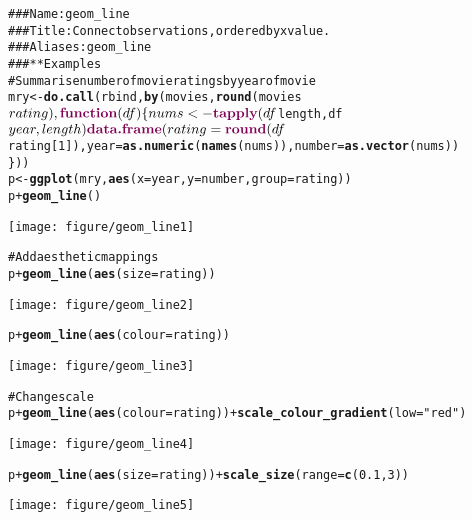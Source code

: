 \documentclass[a4paper,titlepage]{tufte-handout}\usepackage{graphicx, color}
\makeatletter
\def\maxwidth{ %
  \ifdim\Gin@nat@width>\linewidth
    \linewidth
  \else
    \Gin@nat@width
  \fi
}
\newcommand{\hlfunctioncall}[1]{\textcolor[rgb]{0.501960784313725,0,0.329411764705882}{\textbf{#1}}}%
\newcommand{\hlstring}[1]{\textcolor[rgb]{0.6,0.6,1}{#1}}%
\newcommand{\hlcomment}[1]{\textcolor[rgb]{0.180392156862745,0.6,0.341176470588235}{#1}}%
\newenvironment{kframe}{%
 \def\at@end@of@kframe{}%
 \ifinner\ifhmode%
  \def\at@end@of@kframe{\end{minipage}}%
  \begin{minipage}{\columnwidth}%
 \fi\fi%
 \def\FrameCommand##1{\hskip\@totalleftmargin \hskip-\fboxsep
 \colorbox{shadecolor}{##1}\hskip-\fboxsep
     \hskip-\linewidth \hskip-\@totalleftmargin \hskip\columnwidth}%
 \MakeFramed {\advance\hsize-\width
   \@totalleftmargin\z@ \linewidth\hsize
   \@setminipage}}%
 {\par\unskip\endMakeFramed%
 \at@end@of@kframe}
\newenvironment{knitrout}{}{} %
\makeatother
\begin{document}
\begin{knitrout}
\color{fgcolor}\begin{kframe}
\begin{alltt}
\hlcomment{### Name: geom_line}
\hlcomment{### Title: Connect observations, ordered by x value.}
\hlcomment{### Aliases: geom_line}
\hlcomment{### ** Examples}
\hlcomment{# Summarise number of movie ratings by year of movie}
mry <- \hlfunctioncall{do.call}(rbind, \hlfunctioncall{by}(movies, \hlfunctioncall{round}(movies$rating), \hlfunctioncall{function}(df) \{
  nums <- \hlfunctioncall{tapply}(df$length, df$year, length)
  \hlfunctioncall{data.frame}(rating=\hlfunctioncall{round}(df$rating[1]), year = \hlfunctioncall{as.numeric}(\hlfunctioncall{names}(nums)), number=\hlfunctioncall{as.vector}(nums))
\}))
p <- \hlfunctioncall{ggplot}(mry, \hlfunctioncall{aes}(x=year, y=number, group=rating))
p + \hlfunctioncall{geom_line}()
\end{alltt}
\end{kframe}\texttt{[image: figure/geom\_line1]} \begin{kframe}\begin{alltt}
\hlcomment{# Add aesthetic mappings}
p + \hlfunctioncall{geom_line}(\hlfunctioncall{aes}(size = rating))
\end{alltt}
\end{kframe}\texttt{[image: figure/geom\_line2]} \begin{kframe}\begin{alltt}
p + \hlfunctioncall{geom_line}(\hlfunctioncall{aes}(colour = rating))
\end{alltt}
\end{kframe}\texttt{[image: figure/geom\_line3]} \begin{kframe}\begin{alltt}
\hlcomment{# Change scale}
p + \hlfunctioncall{geom_line}(\hlfunctioncall{aes}(colour = rating)) + \hlfunctioncall{scale_colour_gradient}(low=\hlstring{"red"})
\end{alltt}
\end{kframe}\texttt{[image: figure/geom\_line4]} \begin{kframe}\begin{alltt}
p + \hlfunctioncall{geom_line}(\hlfunctioncall{aes}(size = rating)) + \hlfunctioncall{scale_size}(range = \hlfunctioncall{c}(0.1, 3))
\end{alltt}
\end{kframe}\texttt{[image: figure/geom\_line5]} \begin{kframe}\begin{alltt}

\end{alltt}
\end{kframe}
\end{knitrout}
\end{document}

